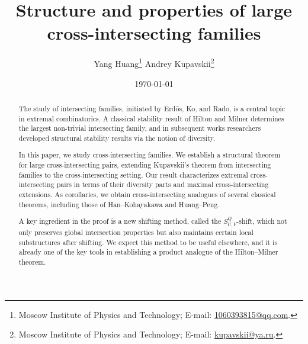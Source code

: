 \documentclass[11pt]{article}
\begin{document}
\title{Structure and properties of large cross-intersecting families}
\author{
Yang Huang\thanks{Moscow Institute of Physics and Technology; 
E-mail: \url{1060393815@qq.com}.}
\quad \quad 
Andrey Kupavskii\thanks{Moscow Institute of Physics and Technology; 
E-mail: \url{kupavskii@ya.ru}. }
}
\date{\today}





\maketitle

\vspace{-0.5cm}
\begin{abstract}

The study of intersecting families, initiated by Erd\H{o}s, Ko, and Rado, is a central topic in extremal combinatorics. A classical stability result of Hilton and Milner determines the largest non-trivial intersecting family, and in subsequent works researchers developed structural stability results via the notion of diversity.

In this paper, we study cross-intersecting families. We establish a structural theorem for large cross-intersecting pairs, extending Kupavskii's theorem from intersecting families to the cross-intersecting setting. Our result characterizes extremal cross-intersecting pairs in terms of their diversity parts and maximal cross-intersecting extensions. As corollaries, we obtain cross-intersecting analogues of several classical theorems, including those of Han--Kohayakawa and Huang--Peng.

A key ingredient in the proof is a new shifting method, called the
$S_{U,V}^{Q}$-shift, which not only preserves global intersection
properties but also maintains certain local substructures after shifting.
We expect this method to be useful elsewhere, and it is already one of the key tools in establishing a product analogue of the Hilton--Milner theorem.




\end{abstract}

\end{document}
